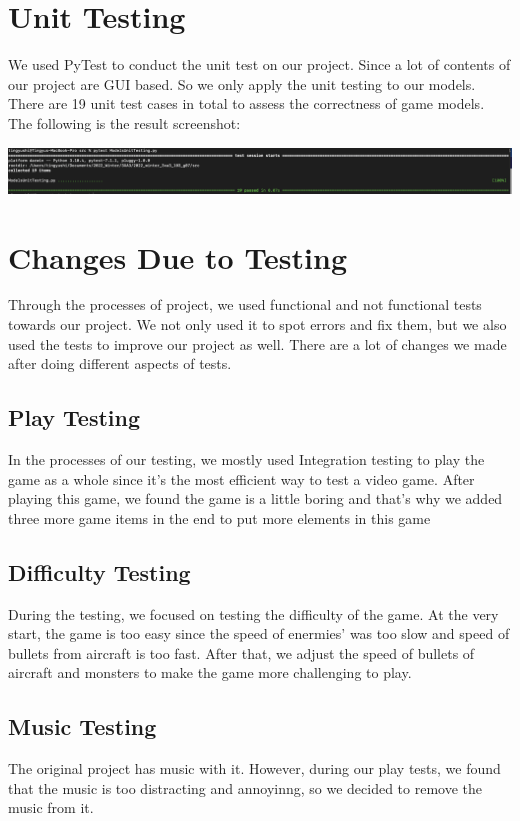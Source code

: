 \documentclass[12pt, titlepage]{article}
\begin{document}
\section{Unit Testing}
We used PyTest to conduct the unit test on our project. Since a lot of contents of our project are GUI based. So we only apply the unit testing to our models.\\
There are 19 unit test cases in total to assess the correctness of game models. The 
following is the result screenshot:
\begin{center}
\includegraphics[scale=0.3]{TestResult.png}
\end{center}
\section{Changes Due to Testing}
Through the processes of project, we used functional and not functional tests towards our project. We not only used it to spot errors and fix them, but we also used the tests to improve our project as well. There are a lot of changes we made after doing different aspects of tests.
\subsection{Play Testing}
In the processes of our testing, we mostly used Integration testing to play the game as a whole since it's the most efficient way to test a video game. After playing this game, we found the game is a little boring and that's why we added three more game items in the end to put more elements in this game
\subsection{Difficulty Testing}
During the testing, we focused on testing the difficulty of the game. At the very start, the game is too easy since the speed of enermies' was too slow and speed of bullets from aircraft is too fast. After that, we adjust the speed of bullets of aircraft and monsters to make the game more challenging to play.
\subsection{Music Testing}
The original project has music with it. However, during our play tests, we found that the music is too distracting and annoyinng, so we decided to remove the music from it.
\end{document}
